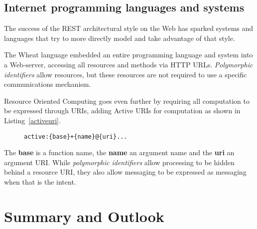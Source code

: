 \documentclass[preprint,authoryear]{acm_proc_article-sp}
\begin{document}
\subsection{Internet programming languages and systems}

The success of the REST architectural style\cite{fielding-rest} on the Web has sparked
systems and languages that try to more directly model and take advantage of that
style.

The Wheat language \cite{wheat} embedded an entire programming language
and system into a Web-server, accessing all resources and methods via
HTTP URLs.  \emph{Polymorphic identifiers} allow resources, but these resources
are not required to use a specific communications mechanism.


Resource Oriented Computing \cite{roc} goes even further by
requiring all computation to be expressed through URIs, adding Active URIs
for computation as shown in Listing~\ref{activeuri}.   



\begin{figure}[htbp]
\begin{lstlisting}[style=L,label= activeuri,caption=Active URI.]
  active:{base}+{name}@{uri}...
\end{lstlisting}
\end{figure}

The {\bf base} is a function name, the {\bf name} an argument name and the
{\bf uri} an argument URI.
 While \emph{polymorphic identifiers} allow processing to be
hidden behind a resource URI, they also allow messaging to be expressed
as messaging when that is the intent.


\section{Summary and Outlook}
\label{summary-and-outlook}
\end{document}
